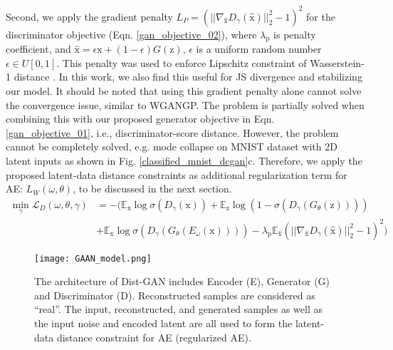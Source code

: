 \documentclass[runningheads]{llncs}
\newcommand*{\eg}{e.g. }
\begin{document}
Second, we apply the gradient penalty $L_P = (||\nabla_{\hat{\mathrm{x}}} D_\gamma(\hat{\mathrm{x}})||_2^2 - 1)^2$ for the discriminator objective (Eqn. \ref{gan_objective_02}), where $\lambda_{\mathrm{p}}$ is penalty coefficient, and $\hat{\mathrm{x}} = \epsilon \mathrm{x} + (1 - \epsilon) G(\mathrm{z})$, $\epsilon$ is a uniform random number $\epsilon \in U[0,1]$. This penalty was used to enforce Lipschitz constraint of Wasserstein-1 distance \cite{gulrajani-arxiv-2017}. In this work, we also find this useful for JS divergence and stabilizing our model. It should be noted that  using this gradient penalty alone 
cannot solve the convergence issue, similar to WGANGP. The problem is partially solved when combining this with our proposed generator objective in Eqn. \ref{gan_objective_01}, i.e., discriminator-score distance. However, the problem cannot be completely solved,  \eg mode collapse on MNIST dataset with 2D latent inputs as shown in Fig. \ref{classified_mnist_dcgan}c. Therefore, we apply the proposed latent-data distance constraints as additional regularization term for AE:  $L_W(\omega,\theta)$, to be discussed in the next section.
\begin{equation}
\begin{split}
\min_{\gamma}\mathcal{L}_D(\omega,\theta,\gamma) & = -(\mathbb{E}_{\mathrm{x}} \log \sigma (D_\gamma(\mathrm{x})) + \mathbb{E}_{\mathrm{z}} \log(1 - \sigma (D_\gamma(G_\theta(\mathrm{z})))) \\
&+ \mathbb{E}_{\mathrm{x}} \log \sigma (D_\gamma(G_\theta(E_\omega(\mathrm{x})))) - \lambda_{\mathrm{p}}\mathbb{E}_{{\hat{\mathrm{x}}}}(||\nabla_{\hat{\mathrm{x}}} D_\gamma(\hat{\mathrm{x}})||_2^2 - 1)^2)
\end{split}
\label{gan_objective_02}
\end{equation}
\begin{figure}[t]
\centering
\texttt{[image: GAAN\_model.png]}
\caption{The architecture of Dist-GAN includes Encoder (E), Generator (G) and Discriminator (D). Reconstructed samples are considered as ``real''. The input, reconstructed, and generated samples as well as the input noise and encoded latent are all used to form the latent-data distance constraint for AE (regularized AE).}
\label{architecture-diagram}
\end{figure}
\end{document}
